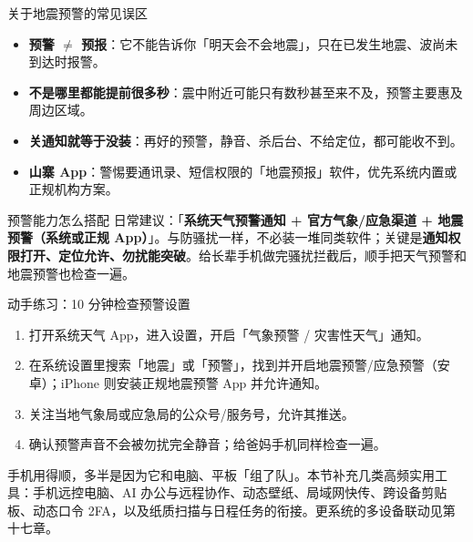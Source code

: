 \begin{tcbwarn}{关于地震预警的常见误区}
\begin{itemize}
  \item \textbf{预警 $\neq$ 预报}：它不能告诉你「明天会不会地震」，只在已发生地震、波尚未到达时报警。
  \item \textbf{不是哪里都能提前很多秒}：震中附近可能只有数秒甚至来不及，预警主要惠及周边区域。
  \item \textbf{关通知就等于没装}：再好的预警，静音、杀后台、不给定位，都可能收不到。
  \item \textbf{山寨 App}：警惕要通讯录、短信权限的「地震预报」软件，优先系统内置或正规机构方案。
\end{itemize}

\end{tcbwarn}

\begin{tcbinfo}{预警能力怎么搭配}
日常建议：「\textbf{系统天气预警通知 + 官方气象/应急渠道 + 地震预警（系统或正规 App）}」。与防骚扰一样，不必装一堆同类软件；关键是\textbf{通知权限打开、定位允许、勿扰能突破}。给长辈手机做完骚扰拦截后，顺手把天气预警和地震预警也检查一遍。

\end{tcbinfo}

\begin{tcbpractice}{动手练习：10 分钟检查预警设置}
\begin{enumerate}
  \item 打开系统天气 App，进入设置，开启「气象预警 / 灾害性天气」通知。
  \item 在系统设置里搜索「地震」或「预警」，找到并开启地震预警/应急预警（安卓）；iPhone 则安装正规地震预警 App 并允许通知。
  \item 关注当地气象局或应急局的公众号/服务号，允许其推送。
  \item 确认预警声音不会被勿扰完全静音；给爸妈手机同样检查一遍。
\end{enumerate}

\end{tcbpractice}


手机用得顺，多半是因为它和电脑、平板「组了队」。本节补充几类高频实用工具：手机远控电脑、AI 办公与远程协作、动态壁纸、局域网快传、跨设备剪贴板、动态口令 2FA，以及纸质扫描与日程任务的衔接。更系统的多设备联动见第十七章。


